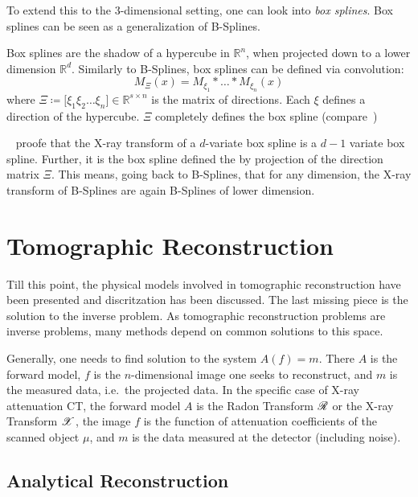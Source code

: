 To extend this to the \(3\)-dimensional setting, one can look into \textit{box splines}. Box splines
can be seen as a generalization of B-Splines.

\begin{definition}
	Box splines are the shadow of a hypercube in \(\mathbb{R}^n\), when projected down to a
	lower dimension \(\mathbb{R}^d\). Similarly to B-Splines, box splines can be defined via
	convolution:
	\begin{equation}
		M_\Xi(x) = M_{\xi_1} * \dots * M_{\xi_n}(x)
	\end{equation}
	where \(\Xi \coloneq \mathopen[ \xi_1 \xi_2 \dots \xi_n \mathclose] \in \mathbb{R}^{s \times n}\)
	is the matrix of directions. Each \(\xi\) defines a direction of the hypercube.
	\(\Xi\) completely defines the box spline (compare~\cite{de_boor_box_1993})
\end{definition}

\citeauthor{entezari_box_2012}~\cite{entezari_box_2012} proofe that the X-ray transform of a
\(d\)-variate box spline is a \(d - 1\) variate box spline. Further, it is the box spline defined
the by projection of the direction matrix \(\Xi\). This means, going back to B-Splines, that for any
dimension, the X-ray transform of B-Splines are again B-Splines of lower dimension.

\chapter{Tomographic Reconstruction}\label{chap:tomographic_reconstruction}

Till this point, the physical models involved in tomographic reconstruction have been presented and
discritzation has been discussed. The last missing piece is the solution to the inverse problem.
As tomographic reconstruction problems are inverse problems, many methods depend on common solutions
to this space.

Generally, one needs to find solution to the system \(A(f) = m\). There \(A\) is the forward model,
\(f\) is the \(n\)-dimensional image one seeks to reconstruct, and \(m\) is the measured data, i.e.\
the projected data. In the specific case of X-ray attenuation CT, the forward model \(A\) is the
Radon Transform \(\mathscr{R}\) or the X-ray Transform \(\mathscr{X}\), the image \(f\) is the function of
attenuation coefficients of the scanned object \(\mu\), and \(m\) is the data measured at the
detector (including noise).

\section{Analytical Reconstruction}\label{sec:analytical_reconstruction}

